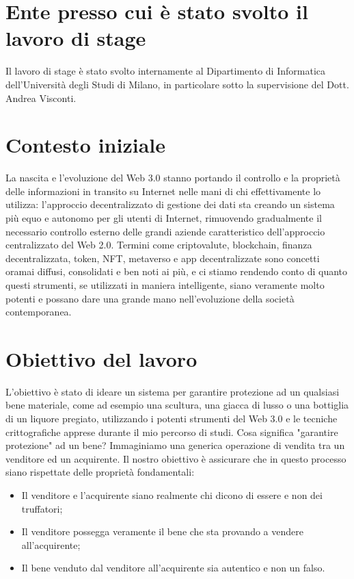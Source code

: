 \documentclass[a4paper, 12pt, italian]{extarticle}
\begin{document}
\section{Ente presso cui è stato svolto il lavoro di stage}
Il lavoro di stage è stato svolto internamente al Dipartimento di Informatica dell'Università degli Studi di Milano, in particolare sotto la supervisione del Dott. Andrea Visconti.

\section{Contesto iniziale}
La nascita e l'evoluzione del Web 3.0 stanno portando il controllo e la proprietà delle informazioni in transito su Internet nelle mani di chi effettivamente lo utilizza: l'approccio decentralizzato di gestione dei dati sta creando un sistema più equo e autonomo per gli utenti di Internet, rimuovendo gradualmente il necessario controllo esterno delle grandi aziende caratteristico dell'approccio centralizzato del Web 2.0.\newline
Termini come criptovalute, blockchain, finanza decentralizzata, token, NFT, metaverso e app decentralizzate sono concetti oramai diffusi, consolidati e ben noti ai più, e ci stiamo rendendo conto di quanto questi strumenti, se utilizzati in maniera intelligente, siano veramente molto potenti e possano dare una grande mano nell'evoluzione della società contemporanea.

\section{Obiettivo del lavoro}
L'obiettivo è stato di ideare un sistema per garantire protezione ad un qualsiasi bene materiale, come ad esempio una scultura, una giacca di lusso o una bottiglia di un liquore pregiato, utilizzando i potenti strumenti del Web 3.0 e le tecniche crittografiche apprese durante il mio percorso di studi.\newline
Cosa significa "garantire protezione" ad un bene? Immaginiamo una generica operazione di vendita tra un venditore ed un acquirente. Il nostro obiettivo è assicurare che in questo processo siano rispettate delle proprietà fondamentali:
\begin{itemize}[topsep=5pt, itemsep=0pt]
    \item Il venditore e l'acquirente siano realmente chi dicono di essere e non dei truffatori;
    \item Il venditore possegga veramente il bene che sta provando a vendere all'acquirente;
    \item Il bene venduto dal venditore all'acquirente sia autentico e non un falso.
\end{itemize}
\end{document}
